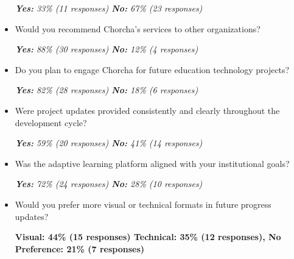 \documentclass[12pt,a4paper,oneside]{book}
\begin{document}
\begin{itemize}
  \textit{\textbf{Yes:} 33\% (11 responses) \quad \textbf{No:} 67\% (23 responses)}\\

  \item Would you recommend Chorcha’s services to other organizations?
  
  \textit{\textbf{Yes:} 88\% (30 responses) \quad \textbf{No:} 12\% (4 responses)}\\

  \item Do you plan to engage Chorcha for future education technology projects?
  
  \textit{\textbf{Yes:} 82\% (28 responses) \quad \textbf{No:} 18\% (6 responses)}\\

  \item Were project updates provided consistently and clearly throughout the development cycle?
  
  \textit{\textbf{Yes:} 59\% (20 responses) \quad \textbf{No:} 41\% (14 responses)}\\

  \item Was the adaptive learning platform aligned with your institutional goals?
  
  \textit{\textbf{Yes:} 72\% (24 responses) \quad \textbf{No:} 28\% (10 responses)}\\

  \item Would you prefer more visual or technical formats in future progress updates?
  
  \textbf{Visual: 44\% (15 responses) \quad Technical: 35\% (12 responses), No Preference: 21\% (7 responses)}\\
\end{itemize}
\end{document}
